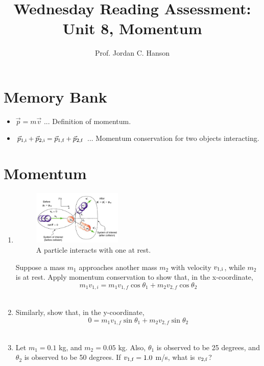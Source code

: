 \documentclass{article}
\begin{document}
\title{Wednesday Reading Assessment: Unit 8, Momentum}
\author{Prof. Jordan C. Hanson}

\maketitle

\section{Memory Bank}

\begin{itemize}
\item $\vec{p} = m\vec{v}$ ... Definition of momentum.
\item $\vec{p}_{\rm 1,i} + \vec{p}_{\rm 2,i} = \vec{p}_{\rm 1,f} + \vec{p}_{\rm 2,f}$ ... Momentum conservation for two objects interacting.
\end{itemize}

\section{Momentum}

\begin{enumerate}
\item
\begin{figure}[ht]
\centering
\includegraphics[width=0.4\textwidth]{collision2.png}
\caption{\label{fig:collision} A particle interacts with one at rest.}
\end{figure}
Suppose a mass $m_1$ approaches another mass $m_2$ with velocity $v_{\rm 1,i}$, while $m_2$ is at rest.  Apply momentum conservation to show that, in the x-coordinate,
\begin{equation}
m_1 v_{1,i} = m_1 v_{1,f}\cos\theta_1 + m_2 v_{2,f}\cos\theta_2
\end{equation} \\ \vspace{1cm}
\item Similarly, show that, in the y-coordinate,
\begin{equation}
0 = m_1 v_{1,f}\sin\theta_1 + m_2 v_{2,f}\sin\theta_2
\end{equation} \\ \vspace{1cm}
\item Let $m_1 = 0.1$ kg, and $m_2 = 0.05$ kg.  Also, $\theta_1$ is observed to be 25 degrees, and $\theta_2$ is observed to be 50 degrees.  If $v_{\rm 1,f} = 1.0$ m/s, what is $v_{\rm 2,f}$?
\end{enumerate}
\end{document}
